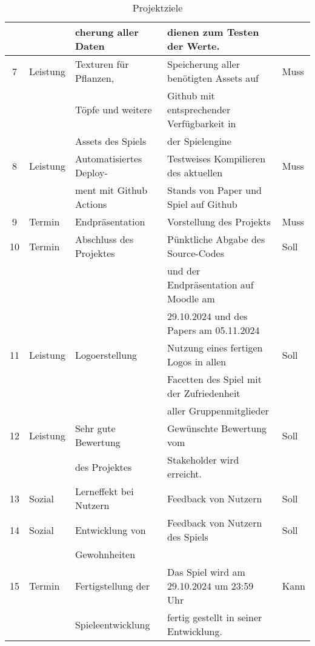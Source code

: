 \begin{table}[H]
\begin{tabular}{|c|l|l|l|l|}
        && cherung aller Daten & dienen zum Testen der Werte. &\\
        \hline
        7 & Leistung & Texturen für Pflanzen, & Speicherung aller benötigten Assets auf & Muss\\
        && Töpfe und weitere & Github mit entsprechender Verfügbarkeit in &\\
        && Assets des Spiels & der Spielengine &\\
        \hline
        8 & Leistung & Automatisiertes Deploy- & Testweises Kompilieren des aktuellen & Muss\\
        && ment mit Github Actions & Stands von Paper und Spiel auf Github&\\
        \hline
        9 & Termin & Endpräsentation & Vorstellung des Projekts & Muss\\
        \hline
        10 & Termin & Abschluss des Projektes & Pünktliche Abgabe des Source-Codes & Soll\\
        &&& und der Endpräsentation auf Moodle am &\\
        &&& 29.10.2024 und des Papers am 05.11.2024&\\
        \hline
        11 & Leistung & Logoerstellung & Nutzung eines fertigen Logos in allen & Soll\\
        &&& Facetten des Spiel mit der Zufriedenheit &\\
        &&& aller Gruppenmitglieder &\\
        \hline
        12 & Leistung & Sehr gute Bewertung & Gewünschte Bewertung vom & Soll\\
        &&  des Projektes & Stakeholder wird erreicht.&\\
        \hline
        13 & Sozial & Lerneffekt bei Nutzern& Feedback von Nutzern & Soll\\
        \hline
        14 & Sozial & Entwicklung von  & Feedback von Nutzern des Spiels & Soll\\
        && Gewohnheiten&&\\
        \hline
        15 & Termin & Fertigstellung der & Das Spiel wird am 29.10.2024 um 23:59 Uhr & Kann\\
        && Spieleentwicklung & fertig gestellt in seiner Entwicklung. &\\
        \hline
    \end{tabular}\label{tab:projektziele}
    \caption{Projektziele}
\end{table}